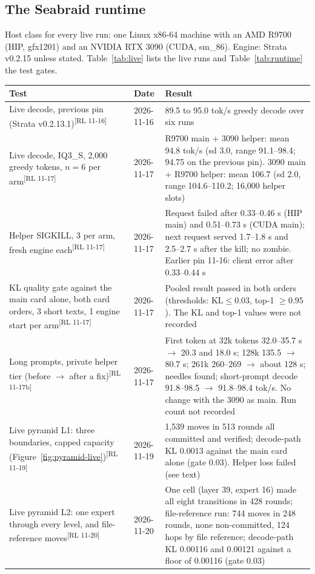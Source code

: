 \documentclass[11pt]{article}
\newcommand{\product}{Seabraid}                 %
\newcommand{\rl}[1]{\textsuperscript{\textnormal{[#1]}}} %
\begin{document}
\subsection{The \product{} runtime}
Host class for every live run: one Linux x86-64 machine with an AMD R9700 (HIP, gfx1201) and an NVIDIA RTX 3090
(CUDA, sm\_86). Engine: Strata v0.2.15 unless stated. Table~\ref{tab:live} lists the live runs and Table~\ref{tab:runtime} the test gates.

\begin{table}[t]
\centering\footnotesize
\begin{tabular}{@{}p{3.3cm}p{2.4cm}p{8.5cm}@{}}
\toprule
Test & Date & Result\\
\midrule
Live decode, previous pin (Strata v0.2.13.1)\rl{RL 11-16} & 2026-11-16 & 89.5 to 95.0 tok/s greedy decode over six runs\\
Live decode, IQ3\_S, 2,000 greedy tokens, $n=6$ per arm\rl{RL 11-17} & 2026-11-17 & R9700 main + 3090 helper: mean 94.8 tok/s (sd 3.0, range 91.1--98.4; 94.75 on the previous pin). 3090 main + R9700 helper: mean 106.7 (sd 2.0, range 104.6--110.2; 16,000 helper slots)\\
Helper SIGKILL, 3 per arm, fresh engine each\rl{RL 11-17} & 2026-11-17 & Request failed after 0.33--0.46 s (HIP main) and 0.51--0.73 s (CUDA main); next request served 1.7--1.8 s and 2.5--2.7 s after the kill; no zombie. Earlier pin 11-16: client error after 0.33--0.44 s\\
KL quality gate against the main card alone, both card orders, 3 short texts, 1 engine start per arm\rl{RL 11-17} & 2026-11-17 & Pooled result passed in both orders (thresholds: $\mathrm{KL}\le 0.03$, top-1 $\ge 0.95$). The KL and top-1 values were not recorded\\
Long prompts, private helper tier (before $\to$ after a fix)\rl{RL 11-17b} & 2026-11-17 & First token at 32k tokens 32.0--35.7 s $\to$ 20.3 and 18.0 s; 128k 135.5 $\to$ 80.7 s; 261k 260--269 $\to$ about 128 s; needles found; short-prompt decode 91.8--98.5 $\to$ 91.8--98.4 tok/s. No change with the 3090 as main. Run count not recorded\\
Live pyramid L1: three boundaries, capped capacity (Figure~\ref{fig:pyramid-live})\rl{RL 11-19} & 2026-11-19 & 1,539 moves in 513 rounds all committed and verified; decode-path KL 0.0013 against the main card alone (gate 0.03). Helper loss failed (see text)\\
Live pyramid L2: one expert through every level, and file-reference moves\rl{RL 11-20} & 2026-11-20 & One cell (layer 39, expert 16) made all eight transitions in 428 rounds; file-reference run: 744 moves in 248 rounds, none non-committed, 124 hops by file reference; decode-path KL 0.00116 and 0.00121 against a floor of 0.00116 (gate 0.03)\\

\end{tabular}
\end{table}
\end{document}
